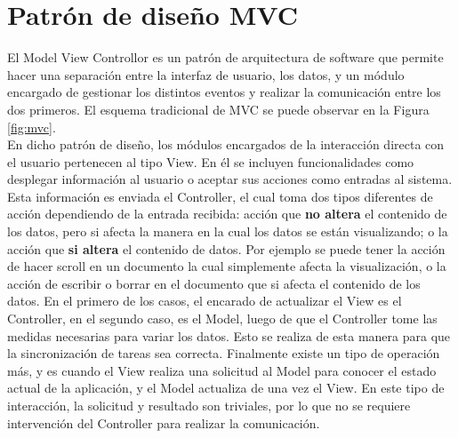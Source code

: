 \clearpage


\section{Patrón de diseño MVC}

El Model View Controllor es un patrón de arquitectura de software que permite hacer una separación entre la interfaz de usuario, los datos, y un módulo encargado de gestionar los distintos eventos y realizar la comunicación entre los dos primeros. El esquema tradicional de MVC se puede observar en la Figura \ref{fig:mvc}.\\

En dicho patrón de diseño, los módulos encargados de la interacción directa con el usuario pertenecen al tipo View. En él se incluyen funcionalidades como desplegar información al usuario o aceptar sus acciones como entradas al sistema. Esta información es enviada el Controller, el cual toma dos tipos diferentes de acción dependiendo de la entrada recibida: acción que \textbf{no altera} el contenido de los datos, pero si afecta la manera en la cual los datos se están visualizando; o la acción que \textbf{si altera} el contenido de datos. Por ejemplo se puede tener la acción de hacer scroll en un documento la cual simplemente afecta la visualización, o la acción de escribir o borrar en el documento que si afecta el contenido de los datos. En el primero de los casos, el encarado de actualizar el View es el Controller, en el segundo caso, es el Model, luego de que el Controller tome las medidas necesarias para variar los datos. Esto se realiza de esta manera para que la sincronización de tareas sea correcta. Finalmente existe un tipo de operación más, y es cuando el View realiza una solicitud al Model para conocer el estado actual de la aplicación, y el Model actualiza de una vez el View. En este tipo de interacción, la solicitud y resultado son triviales, por lo que no se requiere intervención del Controller para realizar la comunicación.\\

